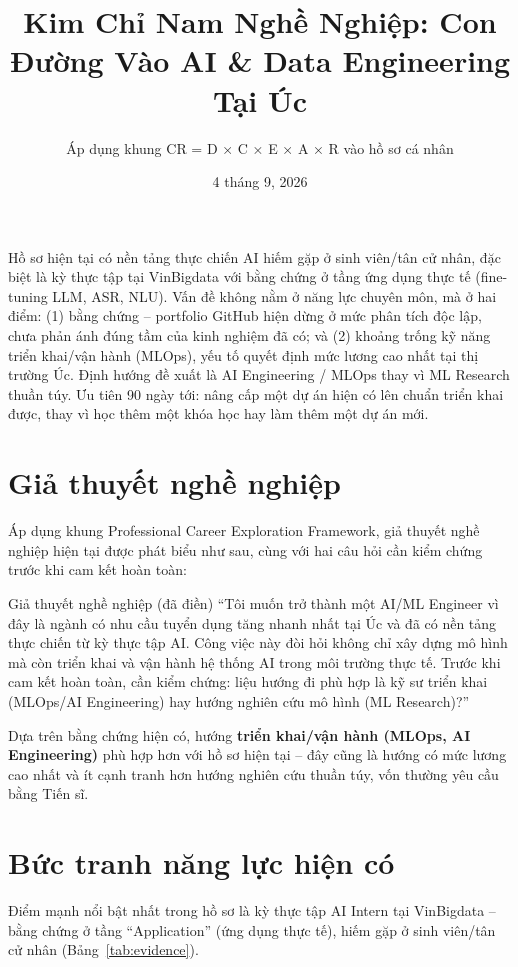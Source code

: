 \documentclass{reportkit}
\title{Kim Chỉ Nam Nghề Nghiệp: Con Đường Vào AI \& Data Engineering Tại Úc}
\author{Áp dụng khung CR = D × C × E × A × R vào hồ sơ cá nhân}
\date{4 tháng 9, 2026}
\begin{document}
\maketitle

\begin{execsummary}
Hồ sơ hiện tại có nền tảng thực chiến AI hiếm gặp ở sinh viên/tân cử nhân, đặc biệt là
kỳ thực tập tại VinBigdata với bằng chứng ở tầng ứng dụng thực tế (fine-tuning LLM,
ASR, NLU). Vấn đề không nằm ở năng lực chuyên môn, mà ở hai điểm: (1) bằng chứng --
portfolio GitHub hiện dừng ở mức phân tích độc lập, chưa phản ánh đúng tầm của kinh
nghiệm đã có; và (2) khoảng trống kỹ năng triển khai/vận hành (MLOps), yếu tố quyết
định mức lương cao nhất tại thị trường Úc. Định hướng đề xuất là AI Engineering /
MLOps thay vì ML Research thuần túy. Ưu tiên 90 ngày tới: nâng cấp một dự án hiện có
lên chuẩn triển khai được, thay vì học thêm một khóa học hay làm thêm một dự án mới.
\end{execsummary}

\section{Giả thuyết nghề nghiệp}
Áp dụng khung Professional Career Exploration Framework, giả thuyết nghề nghiệp hiện
tại được phát biểu như sau, cùng với hai câu hỏi cần kiểm chứng trước khi cam kết
hoàn toàn:

\begin{deliverablenote}{Giả thuyết nghề nghiệp (đã điền)}
``Tôi muốn trở thành một AI/ML Engineer vì đây là ngành có nhu cầu tuyển dụng tăng
nhanh nhất tại Úc và đã có nền tảng thực chiến từ kỳ thực tập AI. Công việc này đòi
hỏi không chỉ xây dựng mô hình mà còn triển khai và vận hành hệ thống AI trong môi
trường thực tế. Trước khi cam kết hoàn toàn, cần kiểm chứng: liệu hướng đi phù hợp là
kỹ sư triển khai (MLOps/AI Engineering) hay hướng nghiên cứu mô hình (ML Research)?''
\end{deliverablenote}

Dựa trên bằng chứng hiện có, hướng \textbf{triển khai/vận hành (MLOps, AI
Engineering)} phù hợp hơn với hồ sơ hiện tại -- đây cũng là hướng có mức lương cao
nhất và ít cạnh tranh hơn hướng nghiên cứu thuần túy, vốn thường yêu cầu bằng Tiến sĩ.

\section{Bức tranh năng lực hiện có}
Điểm mạnh nổi bật nhất trong hồ sơ là kỳ thực tập AI Intern tại VinBigdata -- bằng
chứng ở tầng ``Application'' (ứng dụng thực tế), hiếm gặp ở sinh viên/tân cử nhân
(Bảng~\ref{tab:evidence}).
\end{document}
